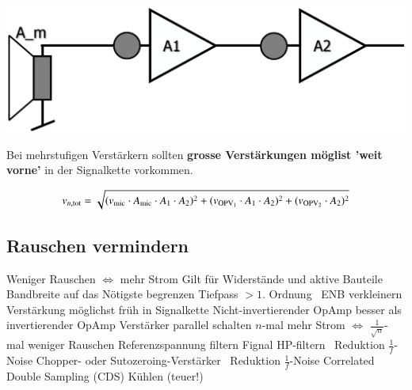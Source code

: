 \begin{minipage}[c]{0.4\columnwidth}
    \includegraphics[width=\columnwidth]{images/signal_to_noise_ratio.png}
\end{minipage}
\hfill
\begin{minipage}[c]{0.58\columnwidth}
    Bei mehrstufigen Verstärkern sollten \textbf{grosse Verstärkungen möglist 'weit vorne'} in der Signalkette vorkommen.
\end{minipage}

$$ v_{n, \rm tot} = \sqrt{(v_{\rm mic} \cdot A_{\rm mic} \cdot A_1 \cdot A_2)^2
+ (v_{\rm OPV_1} \cdot A_1 \cdot A_2)^2 + (v_{\rm OPV_2} \cdot  A_2)^2 } $$


\subsection{Rauschen vermindern}

\begin{outline}
    \1 Weniger Rauschen $\Leftrightarrow$ mehr Strom
        \2 Gilt für Widerstände und aktive Bauteile
    \1 Bandbreite auf das Nötigste begrenzen
        \2 Tiefpass $> 1.$ Ordnung \textrightarrow\ ENB verkleinern
    \1 Verstärkung möglichst früh in Signalkette
    \1 Nicht-invertierender OpAmp besser als invertierender OpAmp
    \1 Verstärker parallel schalten
        \2 $n$-mal mehr Strom $\Leftrightarrow$ $\frac{1}{\sqrt{n}}$-mal weniger Rauschen
    \1 Referenzspannung filtern
    \1 Fignal HP-filtern \textrightarrow\ Reduktion $\frac{1}{f}$-Noise
    \1 Chopper- oder Sutozeroing-Verstärker \textrightarrow\ Reduktion $\frac{1}{f}$-Noise
    \1 Correlated Double Sampling (CDS)
    \1 Kühlen (teuer!)
\end{outline}
